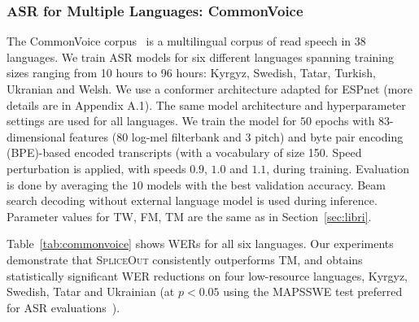 \documentclass{article}
\newcommand{\SpA}{{\textsc{SpliceOut}}\xspace}
\begin{document}
\subsubsection{ASR for Multiple Languages: CommonVoice}
\label{sec:commonvoice}
The CommonVoice corpus~\citep{commonvoice} is a multilingual corpus of read speech in 38 languages. We train ASR models for six different languages spanning training sizes ranging from 10 hours to 96 hours: Kyrgyz, Swedish, Tatar, Turkish, Ukranian and Welsh. We use a conformer architecture adapted for ESPnet\citep{espnetconformer} (more details are in Appendix A.1). The same model architecture and hyperparameter settings are used for all languages. We train the model for $50$ epochs with $83$-dimensional features ($80$ log-mel filterbank and $3$ pitch) and byte pair encoding (BPE)-based encoded transcripts (with a vocabulary of size 150. Speed perturbation is applied, with speeds $0.9$, $1.0$ and $1.1$, during training. Evaluation is done by averaging the $10$ models with the best validation accuracy. Beam search decoding without external language model is used during inference. Parameter values for TW, FM, TM are the same as in Section~\ref{sec:libri}.

Table~\ref{tab:commonvoice} shows WERs for all six languages. Our experiments demonstrate that \SpA consistently outperforms TM, and  obtains statistically significant WER reductions on four low-resource languages, Kyrgyz, Swedish, Tatar and Ukrainian (at $p<0.05$ using the MAPSSWE test preferred for ASR evaluations~\citep{gillick1989some}). 
\end{document}
